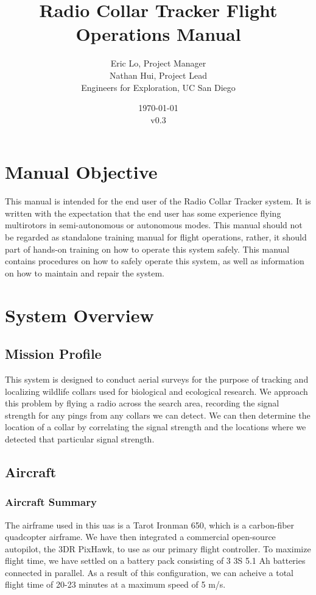 \documentclass{report}
\title{Radio Collar Tracker Flight Operations Manual}
\author{Eric Lo, Project Manager\\Nathan Hui, Project Lead\\Engineers for Exploration, UC San Diego}
\date{\today\\v0.3}
\begin{document}
\maketitle
\tableofcontents
\chapter{Manual Objective}
	This manual is intended for the end user of the Radio Collar Tracker system.  It is written with the expectation that the end user has some experience flying \glspl{multirotor} in semi-autonomous or autonomous modes.  This manual should not be regarded as standalone training manual for flight operations, rather, it should part of hands-on training on how to operate this system safely.  This manual contains procedures on how to safely operate this system, as well as information on how to maintain and repair the system.
\chapter{System Overview}
	\section{Mission Profile}
		This system is designed to conduct aerial surveys for the purpose of tracking and localizing wildlife collars used for biological and ecological research.  We approach this problem by flying a radio across the search area, recording the signal strength for any pings from any collars we can detect.  We can then determine the location of a collar by correlating the signal strength and the locations where we detected that particular signal strength.
	\section{Aircraft}
		\subsection{Aircraft Summary}
			The airframe used in this \gls{uas} is a Tarot Ironman 650, which is a carbon-fiber \gls{quadcopter} airframe.  We have then integrated a commercial open-source autopilot, the 3DR PixHawk, to use as our primary flight controller.  To maximize flight time, we have settled on a battery pack consisting of 3 3S 5.1 Ah batteries connected in parallel.  As a result of this configuration, we can acheive a total flight time of 20-23 minutes at a maximum speed of 5 m/s.
\end{document}
